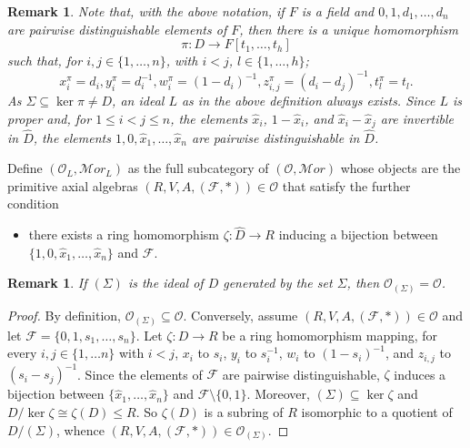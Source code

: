 \documentclass[a4paper]{amsart}
\newtheorem{remark}[lemma]{Remark}
\begin{document}
\begin{remark}\label{dimenticato}
Note that, with the above notation, if $F$ is a field and $0,1, d_1, \ldots , d_n$ are pairwise distinguishable elements of $F$, then there is a unique homomorphism 
$$\pi\colon D\to F[t_1, \ldots , t_h]$$ 
such that, for $i,j\in \{1, \ldots , n\}$, with $i<j$, $l\in \{1, \ldots , h\}$; 
$$
x_i^\pi=d_i, y_i^\pi=d_i^{-1}, w_i^\pi=(1-d_i)^{-1}, z_{i,j}^\pi=(d_i-d_j)^{-1}, t_l^\pi=t_l.
$$
As $\Sigma\subseteq \ker \pi\neq D$,  an ideal $L$ as in the above definition always exists.
Since $L$ is proper and, for $1\leq i<j\leq n$,  the elements $\hat x_i$, $1-\hat x_i$, and $\hat x_i-\hat x_j$ are invertible in $\hat D$,  the elements $1, 0, \hat x_1,\ldots, \hat x_n$ are pairwise distinguishable in ${\hat D}$. 
\end{remark}

Define $({\mathcal O}_{L},{\mathcal Mor}_{L})$ as the full subcategory of $({{\mathcal O},{\mathcal Mor}})$  whose objects are the primitive axial algebras $(R, V, A, (\mathcal F, \ast) )\in {\mathcal O}$ that 
satisfy the further condition
\begin{itemize}
\item [{\rm O4}] there exists a ring homomorphism $\zeta\colon \hat D\to R$
inducing a bijection between $\{1, 0,\hat x_1, \ldots , \hat x_n\}$ and $\mathcal F$.
\end{itemize}

\begin{remark}
If $(\Sigma)$ is the ideal of $D$ generated by the set $\Sigma$, then ${\mathcal O}_{(\Sigma)}={\mathcal O}$.
\end{remark}
\begin{proof}
By definition, ${\mathcal O}_{(\Sigma)}\subseteq {\mathcal O}$. Conversely, assume $(R, V, A, (\mathcal F, \ast) )\in {\mathcal O}$ and let $\mathcal F=\{0,1,s_1, \ldots , s_n\}$. Let $\zeta \colon D\to R$ be a ring homomorphism mapping, for every $i, j\in \{1, \ldots n\}$ with $i<j$,  $x_i$ to $s_i$, $y_i$ to $s_i^{-1}$,  $w_i$ to $(1-s_i)^{-1}$, and $z_{i,j}$ to $(s_i-s_j)^{-1}$.  Since the elements of $\mathcal F$ are pairwise distinguishable, $\zeta$ induces a bijection between $\{\hat x_1, \ldots , \hat x_n\}$ and $\mathcal F\setminus \{0,1\}$. Moreover, $(\Sigma)\subseteq \ker \zeta$ and $D/\ker \zeta\cong \zeta(D)\leq R$. So $\zeta(D)$ is a subring of $R$ isomorphic to a quotient of $D/(\Sigma)$, whence $(R, V, A, (\mathcal F, \ast) )\in {\mathcal O}_{(\Sigma)}$.
\end{proof}
\end{document}
